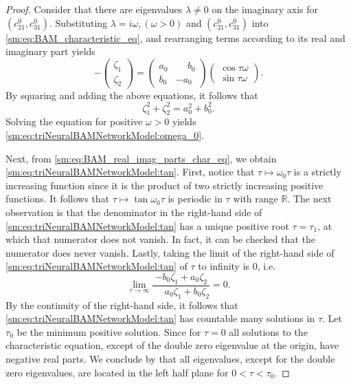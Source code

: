 \begin{proof}
Consider that there are eigenvalues $\lambda\neq0$ on the imaginary
axis for $(c_{21}^{0},c_{31}^{0})$. Substituting $\lambda=i\omega,(\omega>0)$
and $(c_{21}^{0},c_{31}^{0})$ into \cref{sm:eq:BAM_characteristic_eq},
and rearranging terms according to its real and imaginary part yields
\begin{equation}
\label{sm:eq:BAM_real_imag_parts_char_eq}
-\begin{pmatrix}
    \zeta_1 \\
    \zeta_2 
\end{pmatrix}
=
\begin{pmatrix}
    a_0 & \phantom{-}b_0 \\
    b_0 & -a_0
\end{pmatrix}
\begin{pmatrix}
\cos\tau\omega \\
\sin\tau\omega
\end{pmatrix}.
\end{equation}
By squaring and adding the above equations, it follows that
\begin{equation}
    \label{sm:eq:BAM_omega}
    \zeta_1^2 + \zeta_2^2 = a_0^2 + b_0^2.
\end{equation}
Solving the equation for positive $\omega>0$ yields \cref{sm:eq:triNeuralBAMNetworkModel:omega_0}.

Next, from \cref{sm:eq:BAM_real_imag_parts_char_eq}, we obtain \cref{sm:eq:triNeuralBAMNetworkModel:tan}.
First, notice that $\tau \mapsto \omega_0 \tau$ is a strictly increasing
function since it is the product of two strictly increasing positive functions.
It follows that $\tau \mapsto \tan \omega_0 \tau$ is periodic in $\tau$ with
range $\mathbb R$. The next observation is that the denominator in the right-hand
side of \cref{sm:eq:triNeuralBAMNetworkModel:tan} has a unique positive root $\tau=\tau_1$, at which
that numerator does not vanish. In fact, it can be checked that the numerator
does never vanish. Lastly, taking the limit of the right-hand side of
\cref{sm:eq:triNeuralBAMNetworkModel:tan} of $\tau$ to infinity is $0$, i.e.
\[
    \lim_{\tau \rightarrow \infty} \frac{-b_0\zeta_1 + a_0\zeta_2}{\phantom{-}a_0\zeta_1 + b_0\zeta_2} = 0.
\]
By the continuity of the right-hand side, it follows that \cref{sm:eq:triNeuralBAMNetworkModel:tan} has
countable many solutions in $\tau$. Let $\tau_0$ be the minimum positive 
solution. Since for $\tau=0$ all solutions to the characteristic equation, except
of the double zero eigenvalue at the origin, have negative real parts.
We conclude by \cite[Corollary 2.3]{Ruan@2001} that
all eigenvalues, except for the double zero eigenvalues, are located
in the left half plane for $0 < \tau < \tau_0$.
\end{proof}

